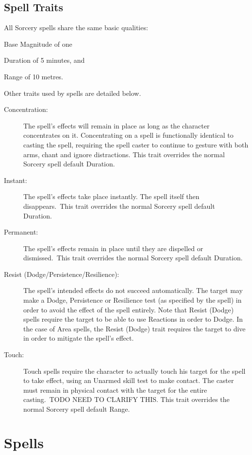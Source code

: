 \subsection{Spell Traits}
All Sorcery spells share the same basic qualities:

\begin{rpg-list}
\item Base Magnitude of one 
\item Duration of 5 minutes, and
\item Range of 10 metres.
\end{rpg-list}

Other traits used by spells are detailed below. 
\begin{description}
	\item[Concentration:] The spell’s effects will remain in place as long as the character concentrates on it. Concentrating on a spell is functionally identical to casting the spell, requiring the spell caster to continue to gesture with both arms, chant and ignore distractions. This trait overrides the normal Sorcery spell default Duration. 
	\item[Instant:] The spell’s effects take place instantly. The spell itself then disappears. This trait overrides the normal Sorcery spell default Duration. 
	\item[Permanent:] The spell’s effects remain in place until they are dispelled or dismissed. This trait overrides the normal Sorcery spell default Duration.
	\item[Resist (Dodge/Persistence/Resilience):] The spell’s intended effects do not succeed automatically. The target may make a Dodge, Persistence or Resilience test (as specified by the spell) in order to avoid the effect of the spell entirely. Note that Resist (Dodge) spells require the target to be able to use Reactions in order to Dodge. In the case of Area spells, the Resist (Dodge) trait requires the target to dive in order to mitigate the spell’s effect. 
	\item[Touch:] Touch spells require the character to actually touch his target for the spell to take effect, using an Unarmed skill test to make contact. The caster must remain in physical contact with the target for the entire casting. TODO NEED TO CLARIFY THIS. This trait overrides the normal Sorcery spell default Range. 
\end{description}

\section{Spells}


